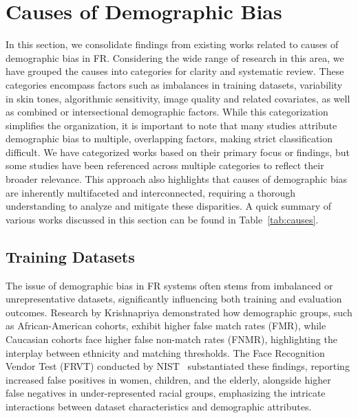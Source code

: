 \section{Causes of Demographic Bias}
\label{sec:causes}

In this section, we consolidate findings from existing works related to causes
of demographic bias in FR. Considering the wide range of research in this area,
we have grouped the causes into categories for clarity and systematic review.
These categories encompass factors such as imbalances in training datasets,
variability in skin tones, algorithmic sensitivity, image quality and related
covariates, as well as combined or intersectional demographic factors. While
this categorization simplifies the organization, it is important to note that
many studies attribute demographic bias to multiple, overlapping factors, making
strict classification difficult. We have categorized works based on their
primary focus or findings, but some studies have been referenced across multiple
categories to reflect their broader relevance. This approach also highlights
that causes of demographic bias are inherently multifaceted and interconnected,
requiring a thorough understanding to analyze and mitigate these disparities.  A
quick summary of various works discussed in this section can be found in
Table~\ref{tab:causes}.


\subsection{Training Datasets}

The issue of demographic bias in FR systems often stems from imbalanced or
unrepresentative datasets, significantly influencing both training and
evaluation outcomes. Research by Krishnapriya \etal
\cite{krishnapriya2020issues} demonstrated how demographic groups, such as
African-American cohorts, exhibit higher false match rates (FMR), while
Caucasian cohorts face higher false non-match rates (FNMR), highlighting the
interplay between ethnicity and matching thresholds. The Face Recognition Vendor
Test (FRVT) conducted by NIST~\cite{frvt3} substantiated these findings,
reporting increased false positives in women, children, and the elderly,
alongside higher false negatives in under-represented racial groups, emphasizing
the intricate interactions between dataset characteristics and demographic
attributes.

